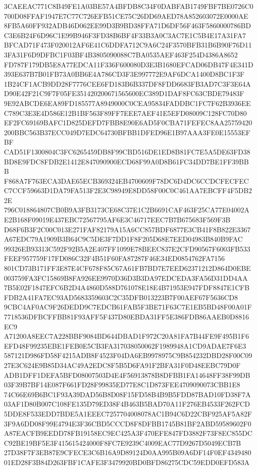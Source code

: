 \documentclass[UTF8,fontset=fandol,zihao=-4,a4paper]{ctexart}
\begin{document}
{{3CAEEAC771C8B49FE1A03BE57A4BFDB8C34F0DABFAB1749FBF7BE0726C0700D08FFAF1947E7C77C726EFB51CE75C26DD69AED78A852603072E0000AE
8FB5A60FF932ADB46D062EE99D3B9BD38FFA71D6DF56F463F5860000786BDC3E6B24F6D96C1E99B946F3FD38B6BF4F33B3A0C3AC7E1C5B4E17A31FA7
BFCAD71F473F020012AF6E41C6DDFA712C9A6C24F3570BFB31B6B90F76D113FA31F6D9DFBC1F03BF4B3805090088C7BA0535AEF463F254D4386A8652
FD787F179DB5E8A77EDCA11F336F600080D3E3B1680EFCAD06DB47F4E341D393E637B7B01FB73A0BB6E4A786CD3F3E997772E9AF6DCA1400D8BC1F3F
1B24CF1ACB9DD28F7776CEE6FD183B6B337DF8FDD6683FB3AD7C3F3E64AD90E42F21C9F7F05FE351420200671565600EC389D1DAF8FC63CBDE79483F
9E92ABCDE6EA89FD185577A8949000C0CEA95834FADDBC1FC7F62B3936EEC789C3E3E4D586E12B1BF563F89FF7EEE7AEF41E5EFD08009C128FC70D80
EF2FC69169BAFC1D825DEFD7FBB8E90E6AD5F0CBA71FEFEC8AA25759420200BBC563B37ECC049D7EDC64730BFBB1DFED96E1B97AAA3FE0E15553EFBF
CAD51F1300804C3FC6265459DB8F99CBD516DE1ED8B81FC7E5A5DE63FD38BD8E9FDC8FDB2E1412E847090900ECD68F99A0D8B61FC34DD7BE1FF39BBB
F868A7F763ECA3DAE65ECB369324EB4700609F78DC6D4DC6CCDCFECFECC7CCF59663D1DA79FA513F2E3C98949E8DD58F00C0C461AA7EBCFF4F5DB22E
796C018864807CB0B9A3FB3173CE68C37E1C2B6691CAF463F25CA77E04002AE2B168F09019E437EBC72567795AF6E3C46717EEC7B7B675683F569F3B
D68F6B3F2C00C013E271FAF82179A15A6CC857BDF6877E3CB41F8B822E3367A67EDC79A1909B3B64C9C5DE3F7DD1F8F205D68E7EED04983B840B9FAC
99326EB93313C592F92B5A2E407FF1099E78BEEC837E2CFD90567F6003FB533FEEF957759F17FD086C32F4B51F60FA87287F46E34ED0854762FA7156
801CD73B171FF3E87E4CF678F85C67A61FB7BD7E7EED62371212D864D0EBE003759FA3FC15869B8FA926EE9970D36D3B3DA97EDCEDA3FA56D31DD4AA
7B5E02F1847EFC6B2D4A4860D588D761078E18E4B71953E947FDF8847E1CFBFDB2A41FA7EC93AD5683359603C2C35DFB013223B7F00AEF67F5636CD8
9CBC4AF0AC9F26DEDD9C7EDCB61FAB5F3BE71F63C7E1EB5BD48F00A01F7718536DFBCFFBB81F93AFF5F437D80EBDA31FF5E386FDB86AAEB0D8816EC9
A71200A8EEC7A228BBF9084BD644DBAD1F972C20A81FA7B44FE9F495B1F6EFD48F99235EBE1FEB0E5CB3FA317038050062F1989948A1CD9ADAE7F6E3
587121D986FD58F4215ADB8F4523F04DA6EB9978975C9B854232DBD28F00C0927E3C624E9B85D34AC49A2EDC8F5B5D6FA91F2BFA31F0D48EEBC79D0F
ADB1DFF1DEFA5BFD08007503D4E4F56913878B8DFBB1FA14648FF38F99DB03F39B7BF14E087F661FD28F99835ED77E8C1D873FEE4709090073CBB1E8
74C66E69B6BC1F93A39DAD56B8D08F15FD58B4B9B5FDD87BAD10FD38F7A03AF1D80B007C108FE135D79ED38F4B463B5BAD70A11F276EB4533F262FCD
5DDE8F533EDD7BDE5A1EEEC7257704008078AC1B94C6D22CBF925AF5A82F3F9A6DD08F99E4794E3F36CBD5CCCD8F8DFBB1745B81BF2ABD59589602F0
A87EACFB9EEDD78FB19158EC9EC425A3F470EFE847FD3882F73F8EC855DCC92BE19BF5E3F415615424000F8FC7E9239C4009EAC77D9267D5049ECB7B
27D38F7F3EB87E9CFECE3C6B16A9D89124D0AA995B09A6DF14F0EF434948001ED28F3B84D263FBF1CAFE3F3479920BD0BFD86275CDC59EDD0EFD583A
}}
\end{document}
